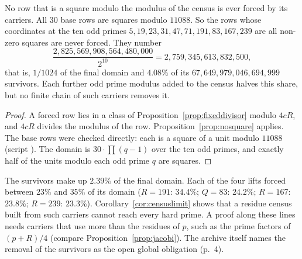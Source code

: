 \begin{corollary}\label{cor:censuslimit}
No row that is a square modulo the modulus of the census is ever forced by its carriers. All $30$ base rows are squares modulo $11088$. So the rows whose coordinates at the ten odd primes $5,19,23,31,47,71,191,83,167,239$ are all non-zero squares are never forced. They number
\[
\frac{2{,}825{,}569{,}908{,}564{,}480{,}000}{2^{10}}=2{,}759{,}345{,}613{,}832{,}500,
\]
that is, $1/1024$ of the final domain and $4.08\%$ of its $67{,}649{,}979{,}046{,}694{,}999$ survivors. Each further odd prime modulus added to the census halves this share, but no finite chain of such carriers removes it.
\end{corollary}
\begin{proof}
A forced row lies in a class of Proposition~\ref{prop:fixeddivisor} modulo $4cR$, and $4cR$ divides the modulus of the row. Proposition~\ref{prop:nosquare} applies. The base rows were checked directly: each is a square of a unit modulo $11088$ (script ). The domain is $30\cdot\prod(q-1)$ over the ten odd primes, and exactly half of the units modulo each odd prime $q$ are squares.
\end{proof}

The survivors make up $2.39\%$ of the final domain. Each of the four lifts forced between $23\%$ and $35\%$ of its domain ($R=191$: $34.4\%$; $Q=83$: $24.2\%$; $R=167$: $23.8\%$; $R=239$: $23.3\%$). Corollary~\ref{cor:censuslimit} shows that a residue census built from such carriers cannot reach every hard prime. A proof along these lines needs carriers that use more than the residues of $p$, such as the prime factors of $(p+R)/4$ (compare Proposition~\ref{prop:jacobi}). The archive itself names the removal of the survivors as the open global obligation (p.~4).

